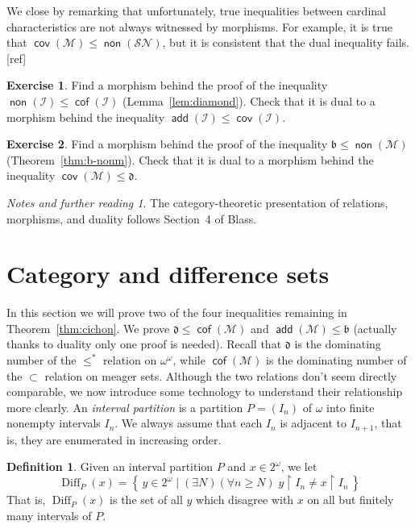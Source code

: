 \documentclass[11pt,oneside]{amsbook}
\newcommand{\set}[1]{\left\{\,#1\,\right\}}
\newcommand{\Meager}{\mathcal M}
\DeclareMathOperator{\add}{\mathsf{add}}
\DeclareMathOperator{\non}{\mathsf{non}}
\DeclareMathOperator{\cov}{\mathsf{cov}}
\DeclareMathOperator{\cof}{\mathsf{cof}}
\DeclareMathOperator{\Diff}{Diff}
\theoremstyle{definition}
\newtheorem{exercise}{Exercise}[section]
\theoremstyle{plain}
\theoremstyle{definition}
\newtheorem{definition}[theorem]{Definition}
\theoremstyle{remark}
\newtheorem*{notes}{Notes and further reading}
\numberwithin{equation}{section}
\numberwithin{figure}{section}
\begin{document}
We close by remarking that unfortunately, true inequalities between cardinal characteristics are not always witnessed by morphisms. For example, it is true that $\cov(\Meager)\leq\non(\mathcal{SN})$, but it is consistent that the dual inequality fails.
[ref] %

\begin{exercise}
  Find a morphism behind the proof of the inequality $\non(\mathcal I)\leq\cof(\mathcal I)$ (Lemma~\ref{lem:diamond}). Check that it is dual to a morphism behind the inequality $\add(\mathcal I)\leq\cov(\mathcal I)$.
\end{exercise}

\begin{exercise}
  Find a morphism behind the proof of the inequality $\mathfrak b\leq\non(\Meager)$ (Theorem~\ref{thm:b-nonm}). Check that it is dual to a morphism behind the inequality $\cov(\Meager)\leq\mathfrak d$.
\end{exercise}

\begin{notes}
  The category-theoretic presentation of relations, morphisms, and duality follows Section~4 of Blass.
\end{notes}


\newpage
\section{Category and difference sets}

In this section we will prove two of the four inequalities remaining in Theorem~\ref{thm:cichon}. We prove $\mathfrak d\leq\cof(\Meager)$ and $\add(\Meager)\leq\mathfrak b$ (actually thanks to duality only one proof is needed). Recall that $\mathfrak d$ is the dominating number of the $\leq^*$ relation on $\omega^\omega$, while $\cof(\Meager)$ is the dominating number of the $\subset$ relation on meager sets. Although the two relations don't seem directly comparable, we now introduce some technology to understand their relationship more clearly. An \emph{interval partition} is a partition $P=(I_n)$ of $\omega$ into finite nonempty intervals $I_n$. We always assume that each $I_n$ is adjacent to $I_{n+1}$, that is, they are enumerated in increasing order.

\begin{definition}
  Given an interval partition $P$ and $x\in2^\omega$, we let
  \[\Diff_P(x)=\set{y\in2^\omega\mid (\exists N)(\forall n\geq N)\;y\restriction I_n\neq x\restriction I_n}
  \]
  That is, $\Diff_P(x)$ is the set of all $y$ which disagree with $x$ on all but finitely many intervals of $P$.
\end{definition}
\end{document}
